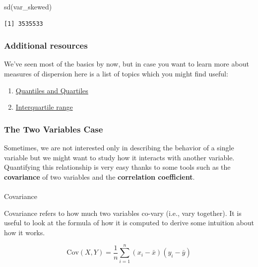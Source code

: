 \documentclass[
  letterpaper,
  DIV=11,
  numbers=noendperiod]{scrartcl}
\makeatletter
\let\oldparagraph\paragraph
\renewcommand{\paragraph}{
    \@ifstar
      \xxxParagraphStar
      \xxxParagraphNoStar
  }
\newcommand{\xxxParagraphStar}[1]{\oldparagraph*{#1}\mbox{}}
\newcommand{\xxxParagraphNoStar}[1]{\oldparagraph{#1}\mbox{}}
\newenvironment{Shaded}{\begin{snugshade}}{\end{snugshade}}
\newcommand{\FunctionTok}[1]{\textcolor[rgb]{0.28,0.35,0.67}{#1}}
\newcommand{\NormalTok}[1]{\textcolor[rgb]{0.00,0.23,0.31}{#1}}
\providecommand{\tightlist}{%
  \setlength{\itemsep}{0pt}\setlength{\parskip}{0pt}}\usepackage{longtable,booktabs,array}
\makeatother
\begin{document}
\begin{Shaded}
\begin{Highlighting}[]
\FunctionTok{sd}\NormalTok{(var\_skewed)}
\end{Highlighting}
\end{Shaded}

\begin{verbatim}
[1] 3535533
\end{verbatim}

\subsubsection{Additional resources}\label{additional-resources}

We've seen most of the basics by now, but in case you want to learn more
about measures of dispersion here is a list of topics which you might
find useful:

\begin{enumerate}
\def\labelenumi{\arabic{enumi}.}
\tightlist
\item
  \href{https://www.scribbr.com/statistics/quartiles-quantiles/\#:~:text=A\%20quartile\%20is\%20a\%20type,sorted\%20data\%20into\%20q\%20parts.}{Quantiles
  and Quartiles}
\item
  \href{https://en.wikipedia.org/wiki/Interquartile_range}{Interquartile
  range}
\end{enumerate}

\subsubsection{The Two Variables Case}\label{the-two-variables-case}

Sometimes, we are not interested only in describing the behavior of a
single variable but we might want to study how it interacts with another
variable. Quantifying this relationship is very easy thanks to some
tools such as the \textbf{covariance} of two variables and the
\textbf{correlation coefficient}.

\paragraph{Covariance}\label{covariance}

Covariance refers to how much two variables co-vary (i.e., vary
together). It is useful to look at the formula of how it is computed to
derive some intuition about how it works.

\[
\text{Cov}(X, Y) = \frac{1}{n} \sum_{i=1}^{n} (x_i - \bar{x})(y_i - \bar{y})
\]
\end{document}
